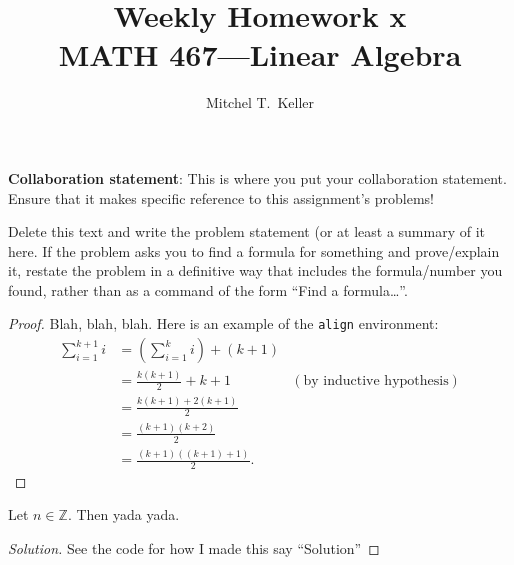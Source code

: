 \documentclass[12pt]{amsart}
\newcommand{\Z}{\mathbb{Z}} %
\newenvironment{theorem}[2][Theorem]{\begin{trivlist}
\item[\hskip \labelsep {\bfseries #1}\hskip \labelsep {\bfseries #2.}]}{\end{trivlist}}
\newenvironment{problem}[2][Problem]{\begin{trivlist}
\item[\hskip \labelsep {\bfseries #1}\hskip \labelsep {\bfseries #2.}]}{\end{trivlist}}
\begin{document}
 
\title{Weekly Homework x\\MATH 467---Linear Algebra}
\author{Mitchel T.\ Keller}
\maketitle

\noindent\textbf{Collaboration statement}: This is where you put your
collaboration statement. Ensure that it makes specific reference to
this assignment's problems!

\begin{problem}{x} %
Delete this text and write the problem statement (or at least a
summary of it here. If the problem asks you to find a formula for
something and prove/explain it, restate the problem in a definitive
way that includes the formula/number you found, rather than as a
command of the form ``Find a formula\dots''. 
\end{problem}
 
\begin{proof}
Blah, blah, blah.  Here is an example of the \texttt{align} environment:
\begin{align*}
\sum_{i=1}^{k+1}i & = \left(\sum_{i=1}^{k}i\right) +(k+1)\\ 
& = \frac{k(k+1)}{2}+k+1 & (\text{by inductive hypothesis})\\
& = \frac{k(k+1)+2(k+1)}{2}\\
& = \frac{(k+1)(k+2)}{2}\\
& = \frac{(k+1)((k+1)+1)}{2}.
\end{align*}
\end{proof}
 
\begin{theorem}{x.yz}
Let \(n\in \Z\).  Then yada yada.
\end{theorem}
 
\begin{proof}[Solution] %
  See the code for how I made this say ``Solution''

\end{proof}
\end{document}
